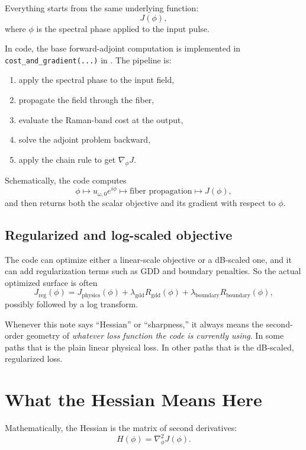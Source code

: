 \documentclass[11pt,letterpaper]{article}
\begin{document}
Everything starts from the same underlying function:
\[
J(\phi),
\]
where $\phi$ is the spectral phase applied to the input pulse.

In code, the base forward-adjoint computation is implemented in
\texttt{cost\_and\_gradient(...)} in
. The pipeline is:
\begin{enumerate}[leftmargin=*]
  \item apply the spectral phase to the input field,
  \item propagate the field through the fiber,
  \item evaluate the Raman-band cost at the output,
  \item solve the adjoint problem backward,
  \item apply the chain rule to get $\nabla_\phi J$.
\end{enumerate}

Schematically, the code computes
\[
\phi \longmapsto u_{\omega,0} e^{i\phi}
\longmapsto \text{fiber propagation}
\longmapsto J(\phi),
\]
and then returns both the scalar objective and its gradient with respect to
$\phi$.

\subsection{Regularized and log-scaled objective}

The code can optimize either a linear-scale objective or a dB-scaled one, and
it can add regularization terms such as GDD and boundary penalties. So the
actual optimized surface is often
\[
J_{\mathrm{reg}}(\phi)
= J_{\mathrm{physics}}(\phi)
  + \lambda_{\mathrm{gdd}} R_{\mathrm{gdd}}(\phi)
  + \lambda_{\mathrm{boundary}} R_{\mathrm{boundary}}(\phi),
\]
possibly followed by a log transform.

\begin{takeaway}
Whenever this note says ``Hessian'' or ``sharpness,'' it always means the
second-order geometry of \emph{whatever loss function the code is currently
using}. In some paths that is the plain linear physical loss. In other paths
that is the dB-scaled, regularized loss.
\end{takeaway}

\section{What the Hessian Means Here}

Mathematically, the Hessian is the matrix of second derivatives:
\[
H(\phi) = \nabla_\phi^2 J(\phi).
\]
\end{document}
